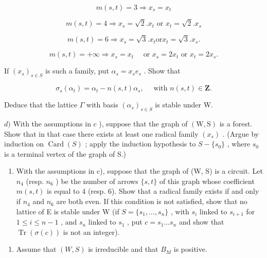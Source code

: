 \[
m (s, t) = 3 \Longrightarrow x _ {s} = x _ {t}
\]

\[
m (s, t) = 4 \Longrightarrow x _ {s} = \sqrt {2}. x _ {t} \text { or } x _ {t} = \sqrt {2}. x _ {s}
\]

\[
m (s, t) = 6 \Longrightarrow x _ {s} = \sqrt {3}. x _ {t} \text {or} x _ {t} = \sqrt {3}. x _ {s}.
\]

\[
m (s, t) = + \infty \Longrightarrow x _ {s} = x _ {t} \quad \text { or } x _ {s} = 2 x _ {t} \text { or } x _ {t} = 2 x _ {s}.
\]

If \((x_{s})_{s\in S}\) is such a family, put \(\alpha_{s} = x_{s}e_{s}\) . Show that

\[
\sigma_ {s} (\alpha_ {t}) = \alpha_ {t} - n (s, t) \alpha_ {s}, \quad \text { with } n (s, t) \in \mathbf {Z}.
\]

Deduce that the lattice \(\Gamma\) with basis \((\alpha_s)_{s\in S}\) is stable under W.

  \(d)\) With the assumptions in \(c\) ), suppose that the graph of \((\mathrm{W},\mathrm{S})\) is a forest. Show that in that case there exists at least one radical family \((x_{s})\) . (Argue by induction on \(\operatorname{Card}(S)\) ; apply the induction hypothesis to \(S - \{s_{0}\}\) , where \(s_{0}\) is a terminal vertex of the graph of S.)

\begin{enumerate}
\def\labelenumi{\alph{enumi})}
\setcounter{enumi}{4}
\tightlist
\item
  With the assumptions in c), suppose that the graph of (W, S) is a circuit. Let \(n_{4}\) (resp. \(n_{6}\) ) be the number of arrows \(\{s, t\}\) of this graph whose coefficient \(m(s, t)\) is equal to 4 (resp. 6). Show that a radical family exists if and only if \(n_{4}\) and \(n_{6}\) are both even. If this condition is not satisfied, show that no lattice of E is stable under W (if \(S = \{s_{1}, \ldots, s_{n}\}\) , with \(s_{i}\) linked to \(s_{i+1}\) for \(1 \leqslant i \leqslant n - 1\) , and \(s_{n}\) linked to \(s_{1}\) , put \(c = s_{1} \ldots s_{n}\) and show that \(\operatorname{Tr}(\sigma(c))\) is not an integer).
\end{enumerate}

\begin{enumerate}
\def\labelenumi{\arabic{enumi})}
\setcounter{enumi}{6}
\tightlist
\item
  Assume that \((W, S)\) is irreducible and that \(B_{M}\) is positive.
\end{enumerate}

